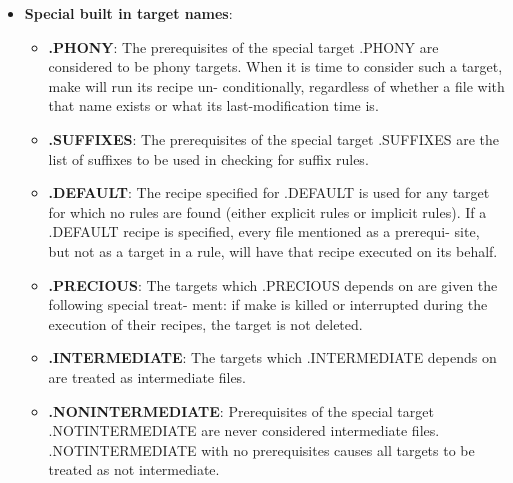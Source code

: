 \documentclass{report}
\begin{document}
\begin{itemize}
\begin{bashcode}
            clean: FORCE
                rm -f *.o editor
            \end{bashcode}
            \bigbreak \noindent 
            FORCE has no prerequisites, and no recipe. Usually no file named FORCE EXISTS. So, when another target depends on it: 
            \bigbreak \noindent 
            \begin{bashcode}
            clean: FORCE
            \end{bashcode}
            \bigbreak \noindent 
            make tries to build FORCE. Since there is normally no real file named FORCE, make treats FORCE as something that is always out of date. That makes clean out of date too, so clean runs.
        \item \textbf{Special built in target names}: 
            \begin{itemize}
                \item \textbf{.PHONY}: The prerequisites of the special target .PHONY are considered to be phony targets. When it is time to consider such a target, make will run its recipe un- conditionally, regardless of whether a file with that name exists or what its last-modification time is. 
                \item \textbf{.SUFFIXES}: The prerequisites of the special target .SUFFIXES are the list of suffixes to be used in checking for suffix rules.
                \item \textbf{.DEFAULT}: The recipe specified for .DEFAULT is used for any target for which no rules are found (either explicit rules or implicit rules).
                    \bigbreak \noindent 
                     If a .DEFAULT recipe is specified, every file mentioned as a prerequi- site, but not as a target in a rule, will have that recipe executed on its behalf.
                \item \textbf{.PRECIOUS}: The targets which .PRECIOUS depends on are given the following special treat- ment: if make is killed or interrupted during the execution of their recipes, the target is not deleted.
                \item \textbf{.INTERMEDIATE}: The targets which .INTERMEDIATE depends on are treated as intermediate files.
                \item \textbf{.NONINTERMEDIATE}: Prerequisites of the special target .NOTINTERMEDIATE are never considered intermediate files. 
                    \bigbreak \noindent 
                    .NOTINTERMEDIATE with no prerequisites causes all targets to be treated as not intermediate.

\end{itemize}
\end{itemize}
\end{document}
